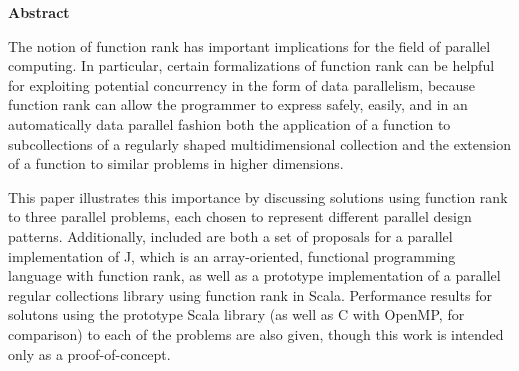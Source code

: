 \begin{center}

\bigskip

\begin{Large}
\textbf{\theTitle}
\end{Large}

\bigskip

\begin{large}
\theAuthor
\end{large}

\bigskip
\bigskip

\textbf{Abstract}

\end{center}

\noindent
The notion of function rank has important implications for the field of parallel computing.
In particular, certain formalizations of function rank can be helpful 
for exploiting potential concurrency in the form of data parallelism, 
because function rank can allow the programmer to express safely, easily, and in an automatically data parallel fashion  
both the application of a function to subcollections of a regularly shaped multidimensional collection and 
the extension of a function to similar problems in higher dimensions.

This paper illustrates this importance 
by discussing solutions using function rank to three parallel problems, 
each chosen to represent different parallel design patterns. 
Additionally, included are both a set of proposals for a parallel implementation of J, 
which is an array-oriented, functional programming language with function rank, 
as well as a prototype implementation of a parallel regular collections library using function rank in Scala. 
Performance results for solutons using the prototype Scala library (as well as C with OpenMP, for comparison) 
to each of the problems are also given, though this work is intended only as a proof-of-concept.
